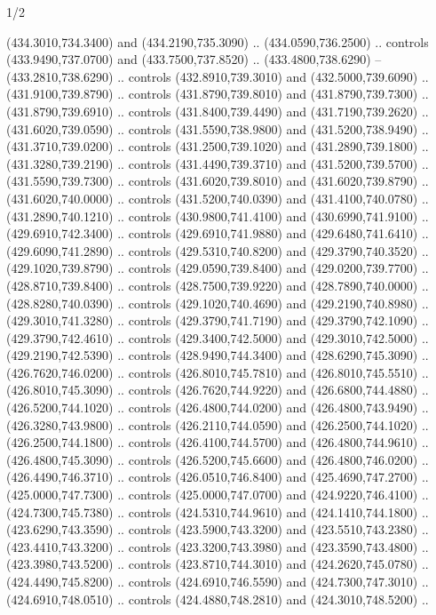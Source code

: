 \begin{flagdescription}{1/2}
\begin{scope}[xshift=0.5\flaglength]
\begin{scope}[scale=0.00745\flagwidth,xshift=-12.1mm,yshift=41.7mm]
\begin{scope}[y=0.80pt, x=0.80pt, yscale=-1, xscale=1, inner sep=0pt, outer sep=0pt]
\begin{scope}[cm={{1.33333,0.0,0.0,-1.33333,(0.0,114.66667)}}]
\begin{scope}[scale=0.100]
  (434.3010,734.3400) and (434.2190,735.3090) .. (434.0590,736.2500) .. controls
  (433.9490,737.0700) and (433.7500,737.8520) .. (433.4800,738.6290) --
  (433.2810,738.6290) .. controls (432.8910,739.3010) and (432.5000,739.6090) ..
  (431.9100,739.8790) .. controls (431.8790,739.8010) and (431.8790,739.7300) ..
  (431.8790,739.6910) .. controls (431.8400,739.4490) and (431.7190,739.2620) ..
  (431.6020,739.0590) .. controls (431.5590,738.9800) and (431.5200,738.9490) ..
  (431.3710,739.0200) .. controls (431.2500,739.1020) and (431.2890,739.1800) ..
  (431.3280,739.2190) .. controls (431.4490,739.3710) and (431.5200,739.5700) ..
  (431.5590,739.7300) .. controls (431.6020,739.8010) and (431.6020,739.8790) ..
  (431.6020,740.0000) .. controls (431.5200,740.0390) and (431.4100,740.0780) ..
  (431.2890,740.1210) .. controls (430.9800,741.4100) and (430.6990,741.9100) ..
  (429.6910,742.3400) .. controls (429.6910,741.9880) and (429.6480,741.6410) ..
  (429.6090,741.2890) .. controls (429.5310,740.8200) and (429.3790,740.3520) ..
  (429.1020,739.8790) .. controls (429.0590,739.8400) and (429.0200,739.7700) ..
  (428.8710,739.8400) .. controls (428.7500,739.9220) and (428.7890,740.0000) ..
  (428.8280,740.0390) .. controls (429.1020,740.4690) and (429.2190,740.8980) ..
  (429.3010,741.3280) .. controls (429.3790,741.7190) and (429.3790,742.1090) ..
  (429.3790,742.4610) .. controls (429.3400,742.5000) and (429.3010,742.5000) ..
  (429.2190,742.5390) .. controls (428.9490,744.3400) and (428.6290,745.3090) ..
  (426.7620,746.0200) .. controls (426.8010,745.7810) and (426.8010,745.5510) ..
  (426.8010,745.3090) .. controls (426.7620,744.9220) and (426.6800,744.4880) ..
  (426.5200,744.1020) .. controls (426.4800,744.0200) and (426.4800,743.9490) ..
  (426.3280,743.9800) .. controls (426.2110,744.0590) and (426.2500,744.1020) ..
  (426.2500,744.1800) .. controls (426.4100,744.5700) and (426.4800,744.9610) ..
  (426.4800,745.3090) .. controls (426.5200,745.6600) and (426.4800,746.0200) ..
  (426.4490,746.3710) .. controls (426.0510,746.8400) and (425.4690,747.2700) ..
  (425.0000,747.7300) .. controls (425.0000,747.0700) and (424.9220,746.4100) ..
  (424.7300,745.7380) .. controls (424.5310,744.9610) and (424.1410,744.1800) ..
  (423.6290,743.3590) .. controls (423.5900,743.3200) and (423.5510,743.2380) ..
  (423.4410,743.3200) .. controls (423.3200,743.3980) and (423.3590,743.4800) ..
  (423.3980,743.5200) .. controls (423.8710,744.3010) and (424.2620,745.0780) ..
  (424.4490,745.8200) .. controls (424.6910,746.5590) and (424.7300,747.3010) ..
  (424.6910,748.0510) .. controls (424.4880,748.2810) and (424.3010,748.5200) ..

\end{scope}
\end{scope}
\end{scope}
\end{scope}
\end{scope}
\end{flagdescription}
